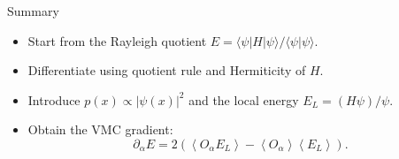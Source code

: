 \documentclass[aspectratio=169]{beamer}
\newcommand{\avg}[1]{\left\langle #1 \right\rangle}
\newcommand{\El}{E_L}
\begin{document}
\begin{frame}{Summary}
\begin{itemize}
\item Start from the Rayleigh quotient $E=\langle \psi|H|\psi\rangle/\langle\psi|\psi\rangle$.
\item Differentiate using quotient rule and Hermiticity of $H$.
\item Introduce $p(x)\propto |\psi(x)|^2$ and the local energy $\El=(H\psi)/\psi$.
\item Obtain the VMC gradient:
\[
\partial_\alpha E =
2\left(\avg{O_\alpha \El}-\avg{O_\alpha}\avg{\El}\right).
\]
\end{itemize}
\end{frame}
\end{document}
